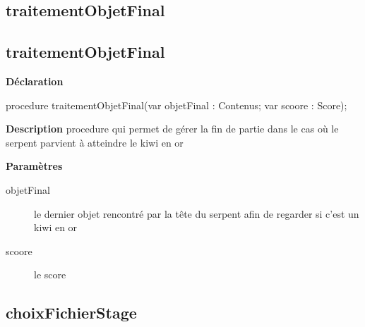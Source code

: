 \documentclass{report}
\newif\ifpdf
\begin{document}
\subsection*{\large{\textbf{traitementObjetFinal}}\normalsize\hspace{1ex}\hrulefill}
\else
\subsection*{traitementObjetFinal}
\fi
\label{Stage-traitementObjetFinal}
\begin{list}{}{
\setlength{\itemindent}{0cm}
\setlength{\listparindent}{0cm}
\setlength{\leftmargin}{\evensidemargin}
\addtolength{\leftmargin}{\tmplength}
\settowidth{\labelsep}{X}
\addtolength{\leftmargin}{\labelsep}
\setlength{\labelwidth}{\tmplength}
}
\item[\textbf{Déclaration}\hfill]
\ifpdf
\begin{flushleft}
\fi
\begin{ttfamily}
procedure traitementObjetFinal(var objetFinal : Contenus; var scoore : Score);\end{ttfamily}

\ifpdf
\end{flushleft}
\fi

\par
\item[\textbf{Description}]
procedure qui permet de gérer la fin de partie dans le cas où le serpent parvient à atteindre le kiwi en or  \par
\item[\textbf{Paramètres}]
\begin{description}
\item[objetFinal] le dernier objet rencontré par la tête du serpent afin de regarder si c'est un kiwi en or
\item[scoore] le score
\end{description}


\end{list}
\ifpdf
\subsection*{\large{\textbf{choixFichierStage}}\normalsize\hspace{1ex}\hrulefill}
\else
\end{document}
